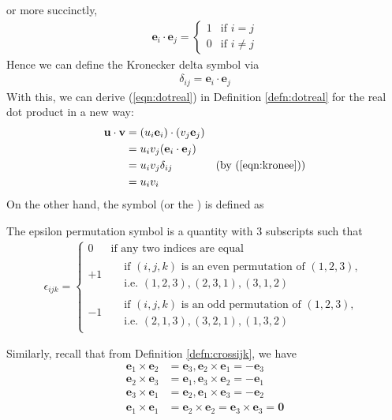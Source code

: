 or more succinctly,
\begin{align}
\textbf{e}_i \cdot \textbf{e}_j = \begin{cases}
1 & \text{if $i=j$} \\
0 & \text{if $i\neq j$}
\end{cases}    
\end{align}
Hence we can define the Kronecker delta symbol via
\begin{align}
\delta_{ij} = \textbf{e}_i \cdot \textbf{e}_j \label{eqn:kronee}
\end{align}
With this, we can derive (\ref{eqn:dotreal}) in Definition \ref{defn:dotreal} for the real dot product in a new way:
\begin{align}
\textbf{u} \cdot \textbf{v} &= (u_i \textbf{e}_i) \cdot (v_j \textbf{e}_j) \nonumber \\
&= u_iv_j (\textbf{e}_i \cdot \textbf{e}_j) \nonumber \\
&= u_iv_j \delta_{ij} & \text{(by (\ref{eqn:kronee}))} \nonumber \\
&= u_iv_i \label{eqn:dotind}
\end{align}
On the other hand, the  symbol (or the ) is defined as
\begin{defn}
\label{defn:epsilon}
The epsilon permutation symbol is a quantity with $3$ subscripts such that
\begin{align}
\label{eqn:epsilon}
\epsilon_{ijk} =
\begin{cases}
0 & \text{if any two indices are equal} \\
+1 & \begin{aligned}
&\text{if $(i,j,k)$ is an even permutation of $(1,2,3)$,} \\
&\text{i.e.\ $(1,2,3), (2,3,1), (3,1,2)$}
\end{aligned}  \\
-1 & \begin{aligned}
&\text{if $(i,j,k)$ is an odd permutation of $(1,2,3)$,} \\
&\text{i.e.\ $(2,1,3), (3,2,1), (1,3,2)$}
\end{aligned}
\end{cases}    
\end{align}
\end{defn}
Similarly, recall that from Definition \ref{defn:crossijk}, we have
\begin{subequations}
\begin{align}
\textbf{e}_1 \times \textbf{e}_2 &= \textbf{e}_3, \textbf{e}_2 \times \textbf{e}_1 = -\textbf{e}_3 \\
\textbf{e}_2 \times \textbf{e}_3 &= \textbf{e}_1, \textbf{e}_3 \times \textbf{e}_2 = -\textbf{e}_1 \\
\textbf{e}_3 \times \textbf{e}_1 &= \textbf{e}_2, \textbf{e}_1 \times \textbf{e}_3 = -\textbf{e}_2 \\
\textbf{e}_1 \times \textbf{e}_1 &= \textbf{e}_2 \times \textbf{e}_2 = \textbf{e}_3 \times \textbf{e}_3 = \textbf{0}
\end{align}   
\end{subequations}
